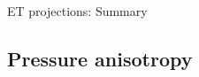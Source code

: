 \documentclass[usenames,dvipsnames,t]{beamer}
\begin{document}
\begin{frame}{ET projections: Summary}
  \def\x{3mm}
  \def\y{2mm}

  \vspace{-4mm}

  \begin{table}[h]
    \centering
    
    \caption{$R_{1.4}$ [km] at 90\% credibility.}
  \end{table}

  \vspace{-4mm}
  \pause

  \begin{table}[h]
    \centering
    
    \caption{Sampling time on 1 NVIDIA H100 GPU.}
  \end{table}

\end{frame}


\subsection{Pressure anisotropy}
\end{document}
